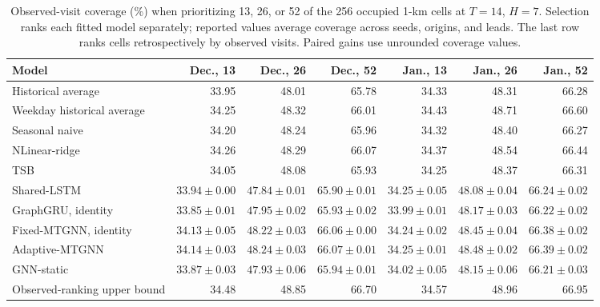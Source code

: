 \begin{table}[!htbp]
\centering
\begingroup
\singlespacing
\fontsize{9pt}{10.5pt}\selectfont
\setlength{\tabcolsep}{4pt}
\renewcommand{\arraystretch}{1.08}
\caption{Observed-visit coverage (\%) when prioritizing 13, 26, or 52 of the 256 occupied 1-km cells at $T=14$, $H=7$. Selection ranks each fitted model separately; reported values average coverage across seeds, origins, and leads. The last row ranks cells retrospectively by observed visits. Paired gains use unrounded coverage values.}
\label{tab:activity_coverage}
\begin{adjustbox}{max width=\linewidth}
\begin{tabular}{lrrrrrr}
\toprule
Model & Dec., 13 & Dec., 26 & Dec., 52 & Jan., 13 & Jan., 26 & Jan., 52 \\
\midrule
Historical average & 33.95 & 48.01 & 65.78 & 34.33 & 48.31 & 66.28 \\
Weekday historical average & 34.25 & 48.32 & 66.01 & 34.43 & 48.71 & 66.60 \\
Seasonal naive & 34.20 & 48.24 & 65.96 & 34.32 & 48.40 & 66.27 \\
NLinear-ridge & 34.26 & 48.29 & 66.07 & 34.37 & 48.54 & 66.44 \\
TSB & 34.05 & 48.08 & 65.93 & 34.25 & 48.37 & 66.31 \\
Shared-LSTM & $33.94\pm 0.00$ & $47.84\pm 0.01$ & $65.90\pm 0.01$ & $34.25\pm 0.05$ & $48.08\pm 0.04$ & $66.24\pm 0.02$ \\
GraphGRU, identity & $33.85\pm 0.01$ & $47.95\pm 0.02$ & $65.93\pm 0.02$ & $33.99\pm 0.01$ & $48.17\pm 0.03$ & $66.22\pm 0.02$ \\
Fixed-MTGNN, identity & $34.13\pm 0.05$ & $48.22\pm 0.03$ & $66.06\pm 0.00$ & $34.24\pm 0.02$ & $48.45\pm 0.04$ & $66.38\pm 0.02$ \\
Adaptive-MTGNN & $34.14\pm 0.03$ & $48.24\pm 0.03$ & $66.07\pm 0.01$ & $34.25\pm 0.01$ & $48.48\pm 0.02$ & $66.39\pm 0.02$ \\
GNN-static & $33.87\pm 0.03$ & $47.93\pm 0.06$ & $65.94\pm 0.01$ & $34.02\pm 0.05$ & $48.15\pm 0.06$ & $66.21\pm 0.03$ \\
\addlinespace[3pt]
Observed-ranking upper bound & 34.48 & 48.85 & 66.70 & 34.57 & 48.96 & 66.95 \\
\bottomrule
\end{tabular}
\end{adjustbox}
\endgroup
\end{table}

